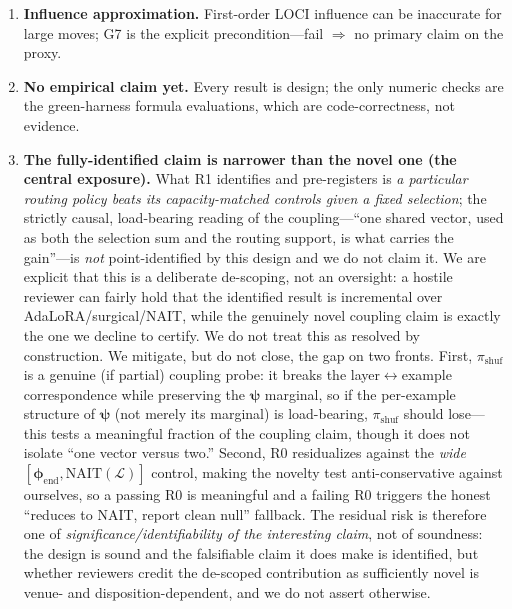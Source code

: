 \documentclass[11pt]{article}
\theoremstyle{definition}
\newcommand{\phend}{\bm{\phi}_{\mathrm{end}}}
\newcommand{\Lset}{\mathcal{L}}
\newcommand{\psivec}{\bm{\psi}}
\begin{document}
\begin{enumerate}[leftmargin=1.5em,itemsep=2pt]
\emph{full} control that $\psivec$ residualizes against. This is a construct-validity risk: an
outcome partitioned by $\phend$ could share variance with an endpoint-anchored selection in a
way that flatters $\psivec$. We do not claim the $0.3/0.6$ G7 floors (Spearman
$\rho(Y,\Delta_{\mathrm{retrain}})$ and ICC$(2,1)$, with lower-CI $>0$) \emph{guarantee}
substantive proxy validity; they are necessary preconditions, not a certificate, and a reviewer
may legitimately argue the floors are too lax. On G7 failure the influence proxy is dropped for
the direct retrain-delta $Y$ (diagnostic), so the headline never rests on an unvalidated proxy.
\item \textbf{Influence approximation.} First-order LOCI influence can be inaccurate for large
moves; G7 is the explicit precondition---fail $\Rightarrow$ no primary claim on the proxy.
\item \textbf{No empirical claim yet.} Every result is design; the only numeric checks are the
green-harness formula evaluations, which are code-correctness, not evidence.
\item \textbf{The fully-identified claim is narrower than the novel one (the central
exposure).} What R1 identifies and pre-registers is \emph{a particular routing policy beats
its capacity-matched controls given a fixed selection}; the strictly causal, load-bearing
reading of the coupling---``one shared vector, used as both the selection sum and the routing
support, is what carries the gain''---is \emph{not} point-identified by this design and we do
not claim it. We are explicit that this is a deliberate de-scoping, not an oversight: a hostile
reviewer can fairly hold that the identified result is incremental over AdaLoRA/surgical/NAIT,
while the genuinely novel coupling claim is exactly the one we decline to certify. We do not
treat this as resolved by construction. We mitigate, but do not close, the gap on two fronts.
First, $\pi_{\mathrm{shuf}}$ is a genuine (if partial) coupling probe: it breaks the
layer$\leftrightarrow$example correspondence while preserving the $\psivec$ marginal, so if the
per-example structure of $\psivec$ (not merely its marginal) is load-bearing, $\pi_{\mathrm{shuf}}$
should lose---this tests a meaningful fraction of the coupling claim, though it does not isolate
``one vector versus two.'' Second, R0 residualizes against the \emph{wide}
$[\phend,\mathrm{NAIT}(\Lset)]$ control, making the novelty test anti-conservative against
ourselves, so a passing R0 is meaningful and a failing R0 triggers the honest ``reduces to NAIT,
report clean null'' fallback. The residual risk is therefore one of
\emph{significance/identifiability of the interesting claim}, not of soundness: the design is
sound and the falsifiable claim it does make is identified, but whether reviewers credit the
de-scoped contribution as sufficiently novel is venue- and disposition-dependent, and we do not
assert otherwise.
\end{enumerate}
\end{document}
